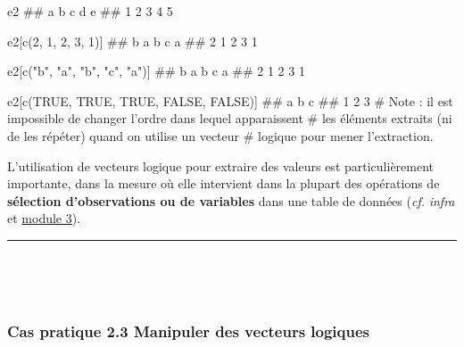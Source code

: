 \documentclass[12pt,twosided, notitlepage]{book}
\newenvironment{Shaded}{}{}
\newcommand{\CommentTok}[1]{\textcolor[rgb]{0.00,0.50,0.00}{#1}}
\newcommand{\DecValTok}[1]{#1}
\newcommand{\KeywordTok}[1]{\textcolor[rgb]{0.00,0.00,1.00}{#1}}
\newcommand{\NormalTok}[1]{#1}
\newcommand{\OtherTok}[1]{\textcolor[rgb]{1.00,0.25,0.00}{#1}}
\newcommand{\StringTok}[1]{\textcolor[rgb]{0.00,0.50,0.50}{#1}}
\renewenvironment{Shaded}{\begin{snugshade}}{\end{snugshade}}
\begin{document}
\begin{Shaded}
\begin{Highlighting}[]
\NormalTok{e2}
\NormalTok{  ## a b c d e }
\NormalTok{  ## 1 2 3 4 5}

\NormalTok{e2[}\KeywordTok{c}\NormalTok{(}\DecValTok{2}\NormalTok{, }\DecValTok{1}\NormalTok{, }\DecValTok{2}\NormalTok{, }\DecValTok{3}\NormalTok{, }\DecValTok{1}\NormalTok{)]}
\NormalTok{  ## b a b c a }
\NormalTok{  ## 2 1 2 3 1}

\NormalTok{e2[}\KeywordTok{c}\NormalTok{(}\StringTok{"b"}\NormalTok{, }\StringTok{"a"}\NormalTok{, }\StringTok{"b"}\NormalTok{, }\StringTok{"c"}\NormalTok{, }\StringTok{"a"}\NormalTok{)]}
\NormalTok{  ## b a b c a }
\NormalTok{  ## 2 1 2 3 1}

\NormalTok{e2[}\KeywordTok{c}\NormalTok{(}\OtherTok{TRUE}\NormalTok{, }\OtherTok{TRUE}\NormalTok{, }\OtherTok{TRUE}\NormalTok{, }\OtherTok{FALSE}\NormalTok{, }\OtherTok{FALSE}\NormalTok{)]}
\NormalTok{  ## a b c }
\NormalTok{  ## 1 2 3}
\CommentTok{# Note : il est impossible de changer l'ordre dans lequel apparaissent}
\CommentTok{# les éléments extraits (ni de les répéter) quand on utilise un vecteur}
\CommentTok{# logique pour mener l'extraction.}
\end{Highlighting}
\end{Shaded}

L'utilisation de vecteurs logique pour extraire des valeurs est
particulièrement importante, dans la mesure où elle intervient dans la
plupart des opérations de \textbf{sélection d'observations ou de
variables} dans une table de données (\emph{cf.} \emph{infra} et
\underline{module 3}).

\begin{center}\rule{0.5\linewidth}{\linethickness}\end{center}

~

~

\hypertarget{cas-pratique-2.3-manipuler-des-vecteurs-logiques}{%
\subsubsection{\texorpdfstring{\textbf{Cas pratique 2.3} Manipuler des
vecteurs
logiques}{Cas pratique 2.3 Manipuler des vecteurs logiques}}\label{cas-pratique-2.3-manipuler-des-vecteurs-logiques}}

\end{document}
